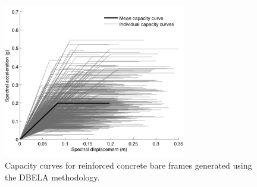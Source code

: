 \begin{figure}[htb]
  \centering
      \includegraphics[width=8cm]{Figures/synthethic_capacity_curves.png}
  \caption{Capacity curves for reinforced concrete bare frames generated using the DBELA methodology.}
  \label{fig:DBELA_cc}
\end{figure}